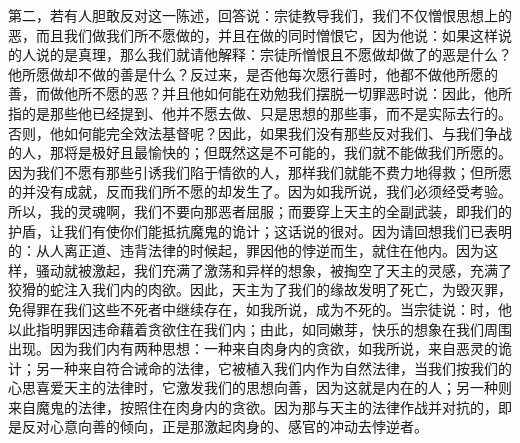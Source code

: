 第二，若有人胆敢反对这一陈述，回答说：宗徒教导我们，我们不仅憎恨思想上的恶，而且我们做我们所不愿做的，并且在做的同时憎恨它，因为他说：如果这样说的人说的是真理，那么我们就请他解释：宗徒所憎恨且不愿做却做了的恶是什么？他所愿做却不做的善是什么？反过来，是否他每次愿行善时，他都不做他所愿的善，而做他所不愿的恶？并且他如何能在劝勉我们摆脱一切罪恶时说：因此，他所指的是那些他已经提到、他并不愿去做、只是思想的那些事，而不是实际去行的。否则，他如何能完全效法基督呢？因此，如果我们没有那些反对我们、与我们争战的人，那将是极好且最愉快的；但既然这是不可能的，我们就不能做我们所愿的。因为我们不愿有那些引诱我们陷于情欲的人，那样我们就能不费力地得救；但所愿的并没有成就，反而我们所不愿的却发生了。因为如我所说，我们必须经受考验。所以，我的灵魂啊，我们不要向那恶者屈服；而要穿上天主的全副武装，即我们的护盾，让我们有使你们能抵抗魔鬼的诡计；这话说的很对。因为请回想我们已表明的：从人离正道、违背法律的时候起，罪因他的悖逆而生，就住在他内。因为这样，骚动就被激起，我们充满了激荡和异样的想象，被掏空了天主的灵感，充满了狡猾的蛇注入我们内的肉欲。因此，天主为了我们的缘故发明了死亡，为毁灭罪，免得罪在我们这些不死者中继续存在，如我所说，成为不死的。当宗徒说：时，他以此指明罪因违命藉着贪欲住在我们内；由此，如同嫩芽，快乐的想象在我们周围出现。因为我们内有两种思想：一种来自肉身内的贪欲，如我所说，来自恶灵的诡计；另一种来自符合诫命的法律，它被植入我们内作为自然法律，当我们按我们的心思喜爱天主的法律时，它激发我们的思想向善，因为这就是内在的人；另一种则来自魔鬼的法律，按照住在肉身内的贪欲。因为那与天主的法律作战并对抗的，即是反对心意向善的倾向，正是那激起肉身的、感官的冲动去悖逆者。\par

